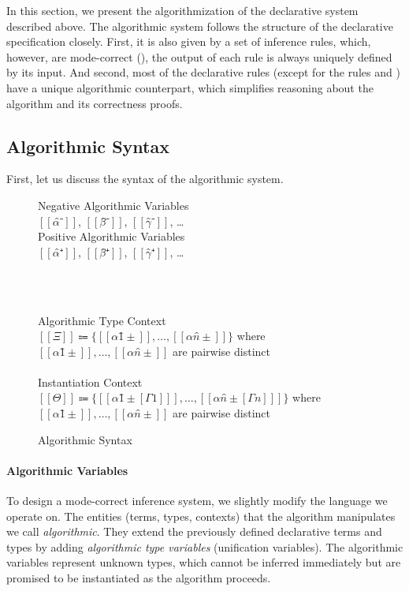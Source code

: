 \label{sec:algorithm}

In this section, we present the algorithmization of the declarative system described above.
The algorithmic system follows the structure of the declarative specification closely.
First, it is also given by a set of inference rules, which, however,
are mode-correct (\cite{dunfield2020:bidirectional}), \ie
the output of each rule is always uniquely defined by its input.
And second, most of the declarative rules 
(except for the rules  and )
have a unique algorithmic counterpart, 
which simplifies reasoning about the algorithm and its correctness proofs.


\subsection{Algorithmic Syntax}
\label{sec:algo-syntax}

First, let us discuss the syntax of the algorithmic system. 

\begin{figure}
  \begin{multicols}{2}
      Negative Algorithmic Variables\\
      $[[α̂⁻]]$, $[[β̂⁻]]$, $[[γ̂⁻]]$, \dots\\
      \columnbreak
      Positive Algorithmic Variables\\
      $[[α̂⁺]]$, $[[β̂⁺]]$, $[[γ̂⁺]]$, \dots\\
  \end{multicols}
  \hfill\\
  \begin{multicols}{2}
      \ottuNShort
      \columnbreak
      \ottuPShort
  \end{multicols}
  \hfill\\
  Algorithmic Type Context\\
   $[[Ξ]] \Coloneqq \{[[α1̂±]], \dots, [[αn̂±]]\}$ where $[[α1̂±]], \dots, [[αn̂±]]$ are pairwise distinct \\
  \hfill\\
  Instantiation Context\\
   $[[Θ]] \Coloneqq \{[[ α1̂±[Γ1] ]], \dots, [[ αn̂±[Γn] ]]\}$ where $[[α1̂±]], \dots, [[αn̂±]]$ are pairwise distinct \\
  \caption{Algorithmic Syntax}
  \label{fig:algo-syntax}
\end{figure}

\paragraph{Algorithmic Variables}
To design a mode-correct inference system, we slightly modify the language we operate on.
The entities (terms, types, contexts) that the algorithm manipulates we call \emph{algorithmic}. 
They extend the previously defined declarative terms and types by adding 
\emph{algorithmic type variables} (\aka unification variables). 
The algorithmic variables represent unknown types, 
which cannot be inferred immediately but are promised to be instantiated
as the algorithm proceeds.


